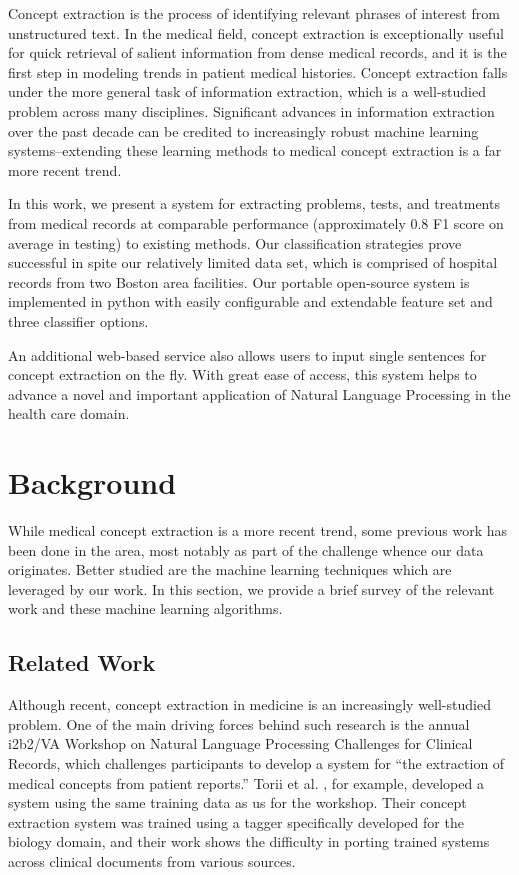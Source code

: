 \documentclass[preprint]{style}
\begin{document}
Concept extraction is the process of identifying relevant phrases of interest from unstructured text. In the medical field, concept extraction is exceptionally useful for quick retrieval of salient information from dense medical records, and it is the first step in modeling trends in patient medical histories. Concept extraction falls under the more general task of information extraction, which is a well-studied problem across many disciplines. Significant advances in information extraction over the past decade can be credited to increasingly robust machine learning systems--extending these learning methods to medical concept extraction is a far more recent trend. 

In this work, we present a system for extracting problems, tests, and treatments from medical records at comparable performance (approximately 0.8 F1 score on average in testing) to existing methods. Our classification strategies prove successful in spite our relatively limited data set, which is comprised of hospital records from two Boston area facilities. Our portable open-source system is implemented in python with easily configurable and extendable feature set and three classifier options. 

An additional web-based service also allows users to input single sentences for concept extraction on the fly. With great ease of access, this system helps to advance a novel and important application of Natural Language Processing in the health care domain.  


\section{Background}
While medical concept extraction is a more recent trend, some previous work has been done in the area, most notably as part of the challenge whence our data originates. Better studied are the machine learning techniques which are leveraged by our work. In this section, we provide a brief survey of the relevant work and these machine learning algorithms.

\subsection{Related Work}
Although recent, concept extraction in medicine is an increasingly well-studied problem. One of the main driving forces behind such research is the annual i2b2/VA Workshop on Natural Language Processing Challenges for Clinical Records, which challenges participants to develop a system for ``the extraction of medical concepts from patient reports.'' Torii et al. \cite{torii}, for example, developed a system using the same training data as us for the workshop. Their concept extraction system was trained using a tagger specifically developed for the biology domain, and their work shows the difficulty in porting trained systems across clinical documents from various sources. 
\end{document}
